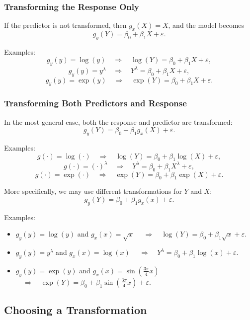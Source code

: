 \subsubsection{Transforming the Response Only}

If the predictor is not transformed, then $g_x(X) = X$, and the model becomes
\[
g_y(Y) = \beta_0 + \beta_1 X + \varepsilon.
\]

Examples:
\[
g_y(y) = \log(y) \quad \Rightarrow \quad \log(Y) = \beta_0 + \beta_1 X + \varepsilon,
\]
\[
g_y(y) = y^\lambda \quad \Rightarrow \quad Y^\lambda = \beta_0 + \beta_1 X + \varepsilon,
\]
\[
g_y(y) = \exp(y) \quad \Rightarrow \quad \exp(Y) = \beta_0 + \beta_1 X + \varepsilon.
\]

\subsubsection{Transforming Both Predictors and Response}

In the most general case, both the response and predictor are transformed:
\[
g_y(Y) = \beta_0 + \beta_1 g_x(X) + \varepsilon.
\]

Examples:
\[
g(\cdot) = \log(\cdot) \quad \Rightarrow \quad \log(Y) = \beta_0 + \beta_1 \log(X) + \varepsilon,
\]
\[
g(\cdot) = (\cdot)^\lambda \quad \Rightarrow \quad Y^\lambda = \beta_0 + \beta_1 X^\lambda + \varepsilon,
\]
\[
g(\cdot) = \exp(\cdot) \quad \Rightarrow \quad \exp(Y) = \beta_0 + \beta_1 \exp(X) + \varepsilon.
\]

More specifically, we may use different transformations for $Y$ and $X$:
\[
g_y(Y) = \beta_0 + \beta_1 g_x(x) + \varepsilon.
\]

Examples:
\begin{itemize}
  \item $g_y(y) = \log(y)$ and $g_x(x) = \sqrt{x}$
  $\quad \Rightarrow \quad \log(Y) = \beta_0 + \beta_1 \sqrt{x} + \varepsilon$.

  \item $g_y(y) = y^\lambda$ and $g_x(x) = \log(x)$
  $\quad \Rightarrow \quad Y^\lambda = \beta_0 + \beta_1 \log(x) + \varepsilon$.

  \item $g_y(y) = \exp(y)$ and $g_x(x) = \sin\!\left(\tfrac{3\pi}{4}x\right)$
  $\quad \Rightarrow \quad \exp(Y) = \beta_0 + \beta_1 \sin\!\left(\tfrac{3\pi}{4}x\right) + \varepsilon$.
\end{itemize}

\subsection{Choosing a Transformation}

